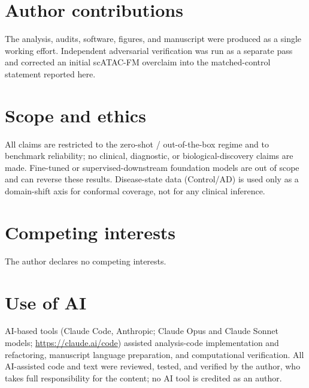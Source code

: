 \documentclass[11pt]{article}
\begin{document}
\section*{Author contributions}
The analysis, audits, software, figures, and manuscript were produced as a single working effort. Independent adversarial verification was run as a separate pass and corrected an initial scATAC-FM overclaim into the matched-control statement reported here.

\section*{Scope and ethics}
All claims are restricted to the zero-shot / out-of-the-box regime and to benchmark reliability; no clinical, diagnostic, or biological-discovery claims are made. Fine-tuned or supervised-downstream foundation models are out of scope and can reverse these results. Disease-state data (Control/AD) is used only as a domain-shift axis for conformal coverage, not for any clinical inference.

\section*{Competing interests}
The author declares no competing interests.

\section*{Use of AI}
AI-based tools (Claude Code, Anthropic; Claude Opus and Claude Sonnet models; \url{https://claude.ai/code}) assisted analysis-code implementation and refactoring, manuscript language preparation, and computational verification. All AI-assisted code and text were reviewed, tested, and verified by the author, who takes full responsibility for the content; no AI tool is credited as an author.
\end{document}
